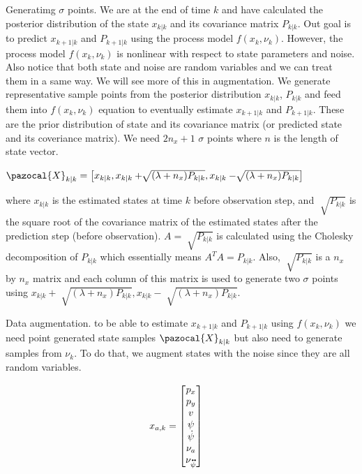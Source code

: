 \documentclass[a4paper,12pt]{article}
\newcommand*{\ddt}[1]{%
  \accentset{\mbox{\large\bfseries .\hspace{-0.25ex}.}}{#1}}
\begin{document}
Generatimg $\sigma$ points. We are at the end of time $k$ and have calculated the posterior distribution of the state $x_{k|k}$ and its covariance matrix $P_{k|k}$. Out goal is to predict $x_{k+1|k}$ and $P_{k+1|k}$ using the process model $f(x_{k},\nu_k)$. However, the process model $f(x_{k},\nu_k)$ is nonlinear with respect to state parameters and noise. Also notice that both state and noise are random variables and we can treat them in a same way. We will see more of this in augmentation. We generate representative sample points from the posterior distribution $x_{k|k}$, $P_{k|k}$ and feed them into $f(x_{k},\nu_k)$ equation to eventually estimate $x_{k+1|k}$ and $P_{k+1|k}$. These are the prior distribution of state and its covariance matrix (or predicted state and its coveriance matrix). 
We need $2n_x+1$ $\sigma$ points where $n$ is the length of state vector. 

$\pazocal{X}_{k|k} = \left[x_{k|k},x_{k|k}+\sqrt[]{(\lambda+n_x)P_{k|k}},
x_{k|k}-\sqrt[]{(\lambda+n_x)P_{k|k}}   \right] $

where $x_{k|k}$ is the estimated states at time $k$ before observation step, and $\sqrt[]{P_{k|k}}$ is the square root of the covariance matrix of the estimated states after the prediction step (before observation). $A = \sqrt[]{P_{k|k}}$ is calculated using the Cholesky decomposition of ${P_{k|k}}$ which essentially means $A^{T}A = {P_{k|k}}$. Also, $\sqrt[]{P_{k|k}}$ is a $n_x$ by $n_x$ matrix and each column of this matrix is used to generate two $\sigma$ points using $x_{k|k}+\sqrt[]{(\lambda+n_x)P_{k|k}},
x_{k|k}-\sqrt[]{(\lambda+n_x)P_{k|k}}$.

Data augmentation. to be able to estimate $x_{k+1|k}$ and $P_{k+1|k}$ using $f(x_{k},\nu_k)$ we need point generated state samples $\pazocal{X}_{k|k}$ but also need to generate samples from $\nu_k$. To do that, we augment states with the noise since they are all random variables. 

  \begin{align}
   x_{a,k} &= \begin{bmatrix}
         p_{x} \\
         p_{y} \\ 
         v \\
         \psi \\
         \dot{\psi} \\
         \nu_{a} \\
         \nu_{\ddt{\psi}} \\
         \end{bmatrix}
  \end{align}
\end{document}
